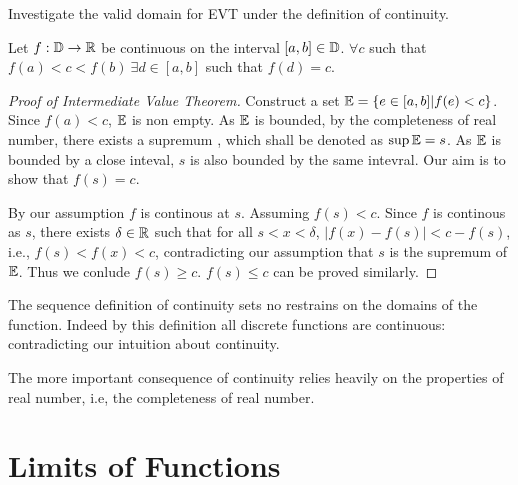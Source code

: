\documentclass[../note.tex]{subfiles}
\begin{document}
\begin{hypothesis}
	Investigate the valid domain for EVT under the definition of continuity. 
\end{hypothesis}

\begin{theorem}
	Let $f: \mathbb{D} \rightarrow \mathbb{R}$ be continuous on the interval $[a,b]\in \mathbb{D}$. $\forall c $ such that $f(a)<c<f(b)\ \exists d \in [a,b] $ such that $ f(d) = c$.  
\end{theorem}

\begin{proof}[Proof of Intermediate Value Theorem]
	Construct a set $\mathbb{E} = \{e\in [a,b]| f(e)<c\}$. Since $f(a)<c$, $\mathbb{E}$ is non empty.  
	As $\mathbb{E}$ is bounded, by the completeness of real number, there exists a supremum , which shall be denoted as $\sup{\mathbb{E}}=s$. 
	As $\mathbb{E}$ is bounded by a close inteval, $s$ is also bounded by the same intevral. Our aim is to show that $f(s)=c$.

	By our assumption $f$ is continous at $s$. Assuming $f(s) < c$. 
	Since $f$ is continous as $s$, there exists $\delta \in \mathbb{R}$ such that for all $s<x<\delta$, $|f(x)-f(s)|<c-f(s)$, i.e., $f(s)<f(x)<c$, contradicting our assumption that $s$ is the supremum of $\mathbb{E}$. 
	Thus we conlude $f(s)\geq c$. $f(s)\leq c$ can be proved similarly.
\end{proof}

\begin{remark}
	The sequence definition of continuity sets no restrains on the domains of the function. Indeed by this definition all discrete functions are continuous: contradicting our intuition about continuity.
	
	The more important consequence of continuity relies heavily on the properties of real number, i.e, the completeness of real number.
\end{remark}




\section{Limits of Functions}
\end{document}
